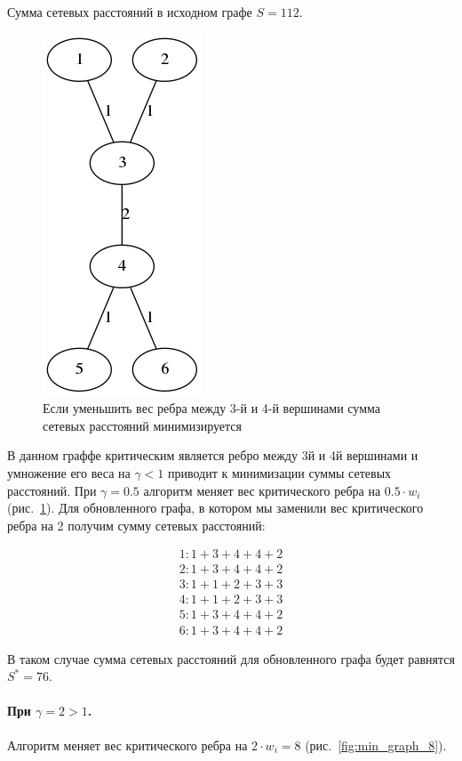 \documentclass[12pt]{article}
\begin{document}
Сумма сетевых расстояний в исходном графе $S = 112$. 

\begin{figure}[h]
    \centering
    \includegraphics[scale=0.7]{min_graph_2.png}
    \caption{Если уменьшить вес ребра между 3-й и 4-й вершинами сумма сетевых расстояний минимизируется}
    \label{fig:min_graph_2}
\end{figure}

В данном граффе критическим является ребро между
3й и 4й вершинами и умножение его веса на
$\gamma < 1$ приводит к минимизации суммы сетевых расстояний.
При $\gamma = 0.5$ алгоритм меняет вес критического ребра на $0.5 \cdot w_i$ (рис.~\ref{fig:min_graph_2}).
Для обновленного графа, в котором мы заменили вес критического ребра на 2 получим сумму сетевых расстояний:

\begin{gather}
1 : 1 + 3 + 4 + 4 + 2 \\
2 : 1 + 3 + 4 + 4 + 2 \\
3 : 1 + 1 + 2 + 3 + 3 \\
4 : 1 + 1 + 2 + 3 + 3 \\
5 : 1 + 3 + 4 + 4 + 2 \\
6 : 1 + 3 + 4 + 4 + 2
\end{gather}

В таком случае сумма сетевых расстояний для обновленного графа будет равнятся $S^* = 76$.

\paragraph{При $\gamma = 2 > 1$.}
Алгоритм меняет вес критического ребра на $2 \cdot w_i = 8$ (рис.~\ref{fig:min_graph_8}).
\end{document}
